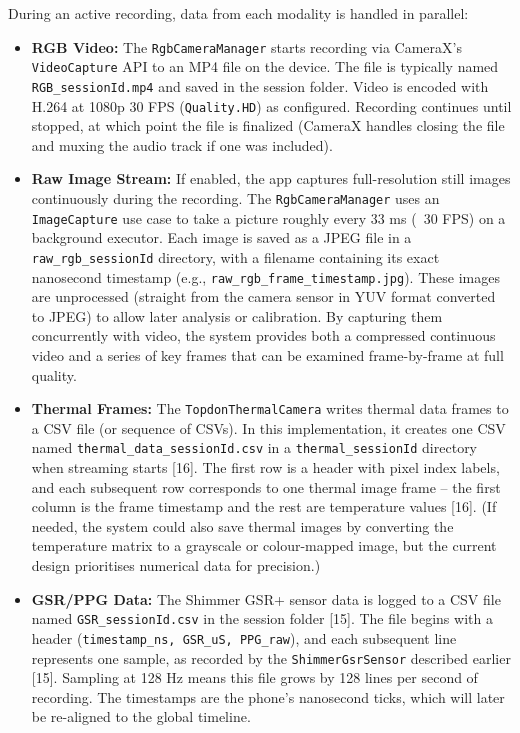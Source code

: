 During an active recording, data from each modality is handled in parallel:
\begin{itemize}
  \item \textbf{RGB Video:} The \texttt{RgbCameraManager} starts recording via CameraX's \texttt{VideoCapture} API to an MP4 file on the device. The file is typically named \texttt{RGB\_\<sessionId\>.mp4} and saved in the session folder. Video is encoded with H.264 at 1080p 30 FPS (\texttt{Quality.HD}) as configured. Recording continues until stopped, at which point the file is finalized (CameraX handles closing the file and muxing the audio track if one was included).
  \item \textbf{Raw Image Stream:} If enabled, the app captures full-resolution still images continuously during the recording. The \texttt{RgbCameraManager} uses an \texttt{ImageCapture} use case to take a picture roughly every 33 ms (~30 FPS) on a background executor. Each image is saved as a JPEG file in a \texttt{raw\_rgb\_\<sessionId\>} directory, with a filename containing its exact nanosecond timestamp (e.g., \texttt{raw\_rgb\_frame\_\<timestamp\>.jpg}). These images are unprocessed (straight from the camera sensor in YUV format converted to JPEG) to allow later analysis or calibration. By capturing them concurrently with video, the system provides both a compressed continuous video and a series of key frames that can be examined frame-by-frame at full quality.
  \item \textbf{Thermal Frames:} The \texttt{TopdonThermalCamera} writes thermal data frames to a CSV file (or sequence of CSVs). In this implementation, it creates one CSV named \texttt{thermal\_data\_\<sessionId\>.csv} in a \texttt{thermal\_\<sessionId\>} directory when streaming starts [16]. The first row is a header with pixel index labels, and each subsequent row corresponds to one thermal image frame -- the first column is the frame timestamp and the rest are temperature values [16]. (If needed, the system could also save thermal images by converting the temperature matrix to a grayscale or colour-mapped image, but the current design prioritises numerical data for precision.)
  \item \textbf{GSR/PPG Data:} The Shimmer GSR+ sensor data is logged to a CSV file named \texttt{GSR\_\<sessionId\>.csv} in the session folder [15]. The file begins with a header (\texttt{timestamp\_ns, GSR\_uS, PPG\_raw}), and each subsequent line represents one sample, as recorded by the \texttt{ShimmerGsrSensor} described earlier [15]. Sampling at 128 Hz means this file grows by 128 lines per second of recording. The timestamps are the phone's nanosecond ticks, which will later be re-aligned to the global timeline.

\end{itemize}
